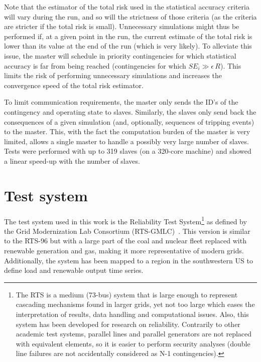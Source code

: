 Note that the estimator of the total risk used in the statistical accuracy criteria will vary during the run, and so will the strictness of those criteria (as the criteria are stricter if the total risk is small). Unnecessary simulations might thus be performed if, at a given point in the run, the current estimate of the total risk is lower than its value at the end of the run (which is very likely). To alleviate this issue, the master will schedule in priority contingencies for which statistical accuracy is far from being reached (\ie contingencies for which \(SE_i \gg \epsilon \, R\)). This limits the risk of performing unnecessary simulations and increases the convergence speed of the total risk estimator.

To limit communication requirements, the master only sends the ID's of the contingency and operating state to slaves. Similarly, the slaves only send back the consequences of a given simulation (and, optionally, sequences of tripping events) to the master. This, with the fact the computation burden of the master is very limited, allows a single master to handle a possibly very large number of slaves. Tests were performed with up to 319 slaves (on a 320-core machine) and showed a linear speed-up with the number of slaves.


\section{Test system}
\label{sec:PDSA_test_system}

The test system used in this work is the Reliability Test System\footnote{The RTS is a medium (73-bus) system that is large enough to represent cascading mechanisms found in larger grids, yet not too large which eases the interpretation of results, data handling and computational issues. Also, this system has been developed for research on reliability. Contrarily to other academic test systems, parallel lines and parallel generators are not replaced with equivalent elements, so it is easier to perform security analyses (double line failures are not accidentally considered as N-1 contingencies).} as defined by the Grid Modernization Lab Consortium (RTS-GMLC)~\cite{RTS-GMLC}. This version is similar to the RTS-96 but with a large part of the coal and nuclear fleet replaced with renewable generation and gas, making it more representative of modern grids. Additionally, the system has been mapped to a region in the southwestern US to define load and renewable output time series.

